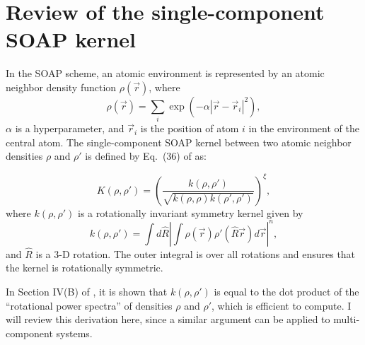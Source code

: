 \documentclass[%
preprint,
amsmath,amssymb,
aps,
]{revtex4-1}
\begin{document}
\section{Review of the single-component SOAP kernel}

In the SOAP scheme, an atomic environment is represented by an atomic neighbor density function $\rho(\vec{r})$, where
\begin{equation}
\rho(\vec{r}) = \sum_i \exp\left(-\alpha | \vec{r} - \vec{r}_i|^2 \right),
\end{equation}
$\alpha$ is a hyperparameter, and $\vec{r}_i$ is the position of atom $i$ in the environment of the central atom. The single-component SOAP kernel between two atomic neighbor densities $\rho$ and $\rho'$ is defined by Eq.\ (36) of \cite{bartok2013representing} as:

\begin{equation}
    K(\rho, \rho') = \left(\frac{k (\rho, \rho')}{\sqrt{k(\rho, \rho) k(\rho', \rho')}} \right) ^{\xi},
\end{equation}
where $k(\rho, \rho')$ is a rotationally invariant symmetry kernel given by
\begin{equation}
k(\rho, \rho') = \int d\hat{R} \left| \int \rho(\vec{r}) \rho'(\hat{R}\vec{r}) d\vec{r} \right| ^n,
\end{equation}
and $\hat{R}$ is a 3-D rotation. The outer integral is over all rotations and ensures that the kernel is rotationally symmetric.

In Section IV(B) of \cite{bartok2013representing}, it is shown that $k(\rho, \rho')$ is equal to the dot product of the ``rotational power spectra'' of densities $\rho$ and $\rho'$, which is efficient to compute. I will review this derivation here, since a similar argument can be applied to multi-component systems.
\end{document}
